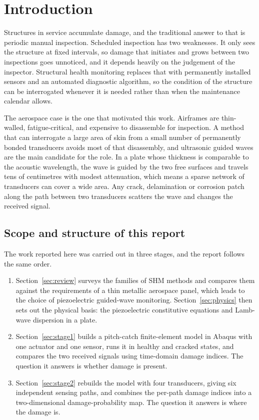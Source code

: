 \section{Introduction}

Structures in service accumulate damage, and the traditional answer to that is periodic manual inspection.
Scheduled inspection has two weaknesses. It only sees the structure at fixed intervals, so damage that
initiates and grows between two inspections goes unnoticed, and it depends heavily on the judgement of the
inspector. Structural health monitoring replaces that with permanently installed sensors and an automated
diagnostic algorithm, so the condition of the structure can be interrogated whenever it is needed rather than
when the maintenance calendar allows.

The aerospace case is the one that motivated this work. Airframes are thin-walled, fatigue-critical, and
expensive to disassemble for inspection. A method that can interrogate a large area of skin from a small
number of permanently bonded transducers avoids most of that disassembly, and ultrasonic guided waves
are the main candidate for the role. In a plate whose thickness is comparable to the acoustic wavelength, the wave
is guided by the two free surfaces and travels tens of centimetres with modest attenuation, which means a
sparse network of transducers can cover a wide area. Any crack, delamination or corrosion patch along the
path between two transducers scatters the wave and changes the received signal.

\subsection{Scope and structure of this report}

The work reported here was carried out in three stages, and the report follows the same order.

\begin{enumerate}[leftmargin=*,itemsep=2pt]
  \item Section~\ref{sec:review} surveys the families of SHM methods and compares them against the
  requirements of a thin metallic aerospace panel, which leads to the choice of piezoelectric guided-wave
  monitoring. Section~\ref{sec:physics} then sets out the physical basis: the piezoelectric constitutive
  equations and Lamb-wave dispersion in a plate.

  \item Section~\ref{sec:stage1} builds a pitch-catch finite-element model in Abaqus with one actuator and
  one sensor, runs it in healthy and cracked states, and compares the two received signals using
  time-domain damage indices. The question it answers is whether damage is present.

  \item Section~\ref{sec:stage2} rebuilds the model with four transducers, giving six independent sensing
  paths, and combines the per-path damage indices into a two-dimensional damage-probability map. The
  question it answers is where the damage is.
\end{enumerate}

